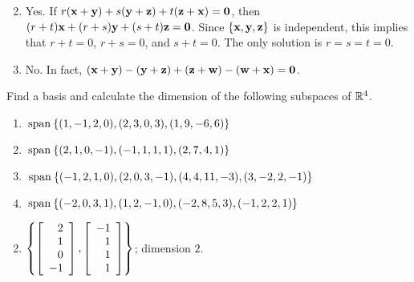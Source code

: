 \begin{multicols}{2}
\begin{ex}
\begin{enumerate}[label={\alph*.}]
\end{enumerate}
\begin{sol}
\begin{enumerate}[label={\alph*.}]
\setcounter{enumi}{1}
\item  Yes. If $r(\textbf{x} + \textbf{y}) + s(\textbf{y} + \textbf{z}) + t(\textbf{z} + \textbf{x}) = \textbf{0}$, then $(r + t)\textbf{x} + (r + s)\textbf{y} + (s + t)\textbf{z} = \textbf{0}$. Since $\{\textbf{x}, \textbf{y}, \textbf{z}\}$ is independent, this implies that $r + t = 0$, $r + s = 0$, and $s + t = 0$. The only solution is $r = s = t = 0$.

\setcounter{enumi}{3}
\item  No. In fact, $(\textbf{x} + \textbf{y}) - (\textbf{y} + \textbf{z}) + (\textbf{z} + \textbf{w}) - (\textbf{w} + \textbf{x}) = \textbf{0}$.

\end{enumerate}
\end{sol}
\end{ex}

\begin{ex}
Find a basis and calculate the dimension of the following subspaces of $\mathbb{R}^4$.

\begin{enumerate}[label={\alph*.}]
\item $\thinspace\operatorname{span\medspace}\{(1, -1, 2, 0), (2, 3, 0, 3), (1, 9, -6, 6)\}$

\item $\thinspace\operatorname{span\medspace}\{(2, 1, 0, -1), (-1, 1, 1, 1), (2, 7, 4, 1)\}$

\item $\thinspace\operatorname{span\medspace}\{(-1, 2, 1, 0), (2, 0, 3, -1), (4, 4, 11, -3), \\ (3, -2, 2, -1)\}$

\item $\thinspace\operatorname{span\medspace}\{(-2, 0, 3, 1), (1, 2, -1, 0), (-2, 8, 5, 3), \\ (-1, 2, 2, 1)\}$

\end{enumerate}
\begin{sol}
\begin{enumerate}[label={\alph*.}]
\setcounter{enumi}{1}
\item 
$\left \{
\left[ \begin{array}{r}
2 \\
1 \\
0 \\
-1
\end{array} \right]
, 
\left[ \begin{array}{r}
-1 \\
1 \\
1 \\
1
\end{array} \right]
\right \}$; dimension $2$. 


\end{enumerate}
\end{sol}
\end{ex}
\end{multicols}
